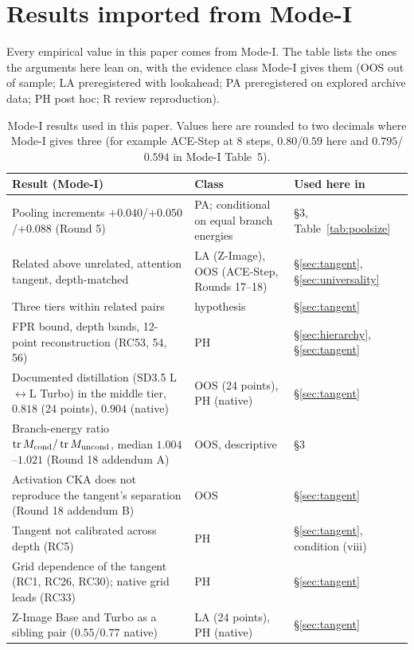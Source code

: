 \documentclass[11pt]{article}
\theoremstyle{definition}
\newcommand{\tr}{\operatorname{tr}}
\begin{document}



\appendix
\section{Results imported from Mode-I}\label{app:imports}
Every empirical value in this paper comes from Mode-I. The table lists the ones the arguments here lean on, with the evidence class Mode-I gives them (OOS out of sample; LA preregistered with lookahead; PA preregistered on explored archive data; PH post hoc; R review reproduction).
\begin{table}[htbp]
\centering\small
\caption{Mode-I results used in this paper. Values here are rounded to two decimals where Mode-I gives three (for example ACE-Step at 8 steps, $0.80$/$0.59$ here and $0.795$/$0.594$ in Mode-I Table~5).}
\label{tab:imports}
\begin{tabularx}{\linewidth}{@{}>{\raggedright\arraybackslash}p{4.4cm}>{\raggedright\arraybackslash}p{1.9cm}L@{}}
\toprule
Result (Mode-I) & Class & Used here in\\
\midrule
Pooling increments $+0.040$/$+0.050$/$+0.088$ (Round 5) & PA; conditional on equal branch energies & \S3, Table~\ref{tab:poolsize}\\
Related above unrelated, attention tangent, depth-matched & LA (Z-Image), OOS (ACE-Step, Rounds 17--18) & \S\ref{sec:tangent}, \S\ref{sec:universality}\\
Three tiers within related pairs & hypothesis & \S\ref{sec:tangent}\\
FPR bound, depth bands, 12-point reconstruction (RC53, 54, 56) & PH & \S\ref{sec:hierarchy}, \S\ref{sec:tangent}\\
Documented distillation (SD3.5 L$\leftrightarrow$L Turbo) in the middle tier, $0.818$ (24 points), $0.904$ (native) & OOS (24 points), PH (native) & \S\ref{sec:tangent}\\
Branch-energy ratio $\tr M_{\rm cond}/\tr M_{\rm uncond}$, median $1.004$--$1.021$ (Round 18 addendum A) & OOS, descriptive & \S3\\
Activation CKA does not reproduce the tangent's separation (Round 18 addendum B) & OOS & \S\ref{sec:tangent}\\
Tangent not calibrated across depth (RC5) & PH & \S\ref{sec:tangent}, condition (viii)\\
Grid dependence of the tangent (RC1, RC26, RC30); native grid leads (RC33) & PH & \S\ref{sec:tangent}\\
Z-Image Base and Turbo as a sibling pair ($0.55$/$0.77$ native) & LA (24 points), PH (native) & \S\ref{sec:tangent}\\

\end{tabularx}
\end{table}
\end{document}

